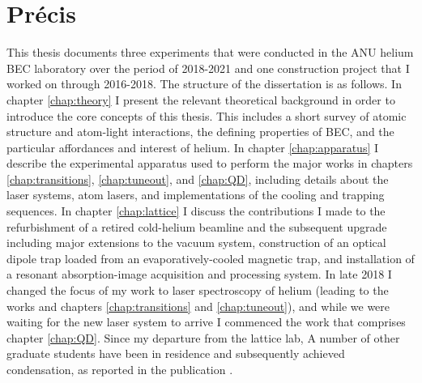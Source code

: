 	


\section*{Pr\'{e}cis}\label{sec:precis}


	This thesis documents three experiments that were conducted in the ANU helium BEC laboratory over the period of 2018-2021 and one construction project that I worked on through 2016-2018. The structure of the dissertation is as follows.
	In chapter \ref{chap:theory} I present the relevant theoretical background in order to introduce the core concepts of this thesis. This includes a short survey of atomic structure and atom-light interactions, the defining properties of BEC, and the particular affordances and interest of helium.
	In chapter \ref{chap:apparatus} I describe the experimental apparatus used to perform the major works in chapters \ref{chap:transitions}, \ref{chap:tuneout}, and \ref{chap:QD}, including details about the laser systems, atom lasers, and implementations of the cooling and trapping sequences.
	In chapter \ref{chap:lattice} I discuss the contributions I made to the refurbishment of a retired cold-helium beamline and the subsequent upgrade including major extensions to the vacuum system, construction of  an optical dipole trap loaded from an evaporatively-cooled magnetic trap, and installation of a resonant absorption-image acquisition and processing system. In late 2018 I changed the focus of my work to laser spectroscopy of helium (leading to the works \cite{Henson22,Thomas20,Ross20} and chapters \ref{chap:transitions} and \ref{chap:tuneout}), and while we were waiting for the new laser system to arrive I commenced the work that comprises chapter \ref{chap:QD}. Since my departure from the lattice lab, A number of	other graduate students have been in residence and subsequently achieved condensation, as reported in the publication \cite{Abbas21}.
	 
